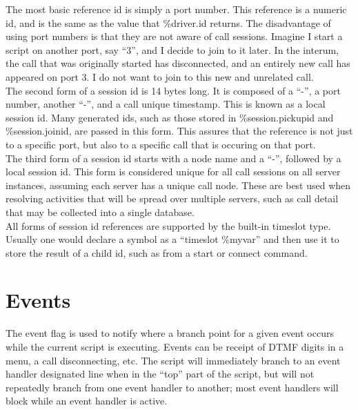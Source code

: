 \documentclass[a4paper,12pt]{article}
\begin{document}
The most basic reference id is simply a port number.  This reference is a 
numeric id, and is the same as the value that \%driver.id returns.  The 
disadvantage of using port numbers is that they are not aware of call 
sessions.  Imagine I start a script on another port, say ``3'', and I 
decide to join to it later.  In the interum, the call that was originally 
started has disconnected, and an entirely new call has appeared on port 3.  
I do not want to join to this new and unrelated call. \\

The second form of a session id is 14 bytes long.  It is composed of a 
``-'', a port number, another ``-'', and a call unique timestamp.  This is 
known as a local session id.  Many generated ids, such as those stored in 
\%session.pickupid and \%session.joinid, are passed in this form.  This 
assures that the reference is not just to a specific port, but also to a 
specific call that is occuring on that port. \\

The third form of a session id starts with a node name and a ``-'', 
followed by a local session id.  This form is considered unique for all 
call sessions on all server instances, assuming each server has a unique 
call node.  These are best used when resolving activities that will be 
spread over multiple servers, such as call detail that may be collected 
into a single database. \\

All forms of session id references are supported by the built-in timeslot
type. Usually one would declare a symbol as a ``timeslot \%myvar'' and then
use it to store the result of a child id, such as from a start or connect
command. \\

\section{Events}

The event flag is used to notify where a branch point for a given event
occurs while the current script is executing.  Events can be receipt of
DTMF digits in a menu, a call disconnecting, etc.  The script will
immediately branch to an event handler designated line when in the
``top'' part of the script, but will not repeatedly branch from one
event handler to another; most event handlers will block while an event
handler is active.  \\
\end{document}
